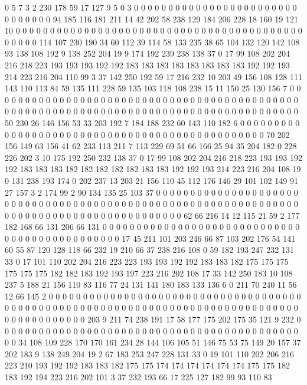 0 5 7 3 2 230 178 59 17 127 9 5 0 3 0 0 0 0 0 0
0 0 0 0 0 0 0 0 0 0 0 0 0 0 0 0 0 0 0 0
0 0 0 0 0 94 185 116 181 211 14 42 202 58 238 129 184 206 228 18
160 19 121 10 0 0 0 0 0 0 0 0 0 0 0 0 0 0 0 0
0 0 0 0 0 0 0 0 0 0 0 0 0 0 0 0 0 0 0 0
0 0 0 0 0 0 0 0 0 0 0 114 107 230 190 34 60 112 39 114
58 133 235 38 65 104 132 120 142 108 93 138 108 192 9 138 252 204 19 9
174 192 239 238 138 37 0 17 99 108 202 204 216 218 223 193 193 193 192 192
183 183 183 183 183 183 183 183 192 192 193 214 223 216 204 110 99 3 37 142
250 192 59 17 216 232 10 203 49 156 108 128 111 143 110 113 84 59 135 111
228 59 135 103 118 108 238 15 11 150 25 130 156 7 0 0 0 0 0 0
0 0 0 0 0 0 0 0 0 0 0 0 0 0 0 0 0 0 0 0
0 0 0 0 0 0 0 0 0 0 0 0 0 0 0 0 0 0 0 0
0 0 0 0 0 0 0 0 0 0 0 0 0 0 0 0 0 0 0 0
0 0 0 0 0 0 0 0 0 0 0 0 0 0 0 0 0 0 0 0
0 0 50 230 26 146 156 53 33 203 192 7 184 188 232 60 143 110 182 6
0 0 0 0 0 0 0 0 0 0 0 0 0 0 0 0 0 0 0 0
0 0 0 0 0 0 0 0 0 0 0 0 0 0 0 0 0 0 0 0
0 0 0 0 0 0 0 70 202 156 149 63 156 41 62 233 113 211 7 113
229 69 51 66 166 25 94 35 204 182 0 228 226 202 3 10 175 192 250 232
138 37 0 17 99 108 202 204 216 218 223 193 193 192 192 183 183 183 182 182
182 182 182 183 183 192 192 193 214 223 216 204 108 19 0 131 238 193 174 0
202 237 13 203 21 156 110 45 112 176 146 29 101 102 149 91 27 157 3 2
174 99 2 90 134 135 25 103 37 0 0 0 0 0 0 0 0 0 0 0
0 0 0 0 0 0 0 0 0 0 0 0 0 0 0 0 0 0 0 0
0 0 0 0 0 0 0 0 0 0 0 0 0 0 0 0 0 0 0 0
0 0 0 0 0 0 0 0 0 0 0 0 0 0 0 0 0 0 0 0
0 0 0 0 0 0 0 0 0 0 0 0 0 0 0 0 0 0 0 62
66 216 14 12 115 21 59 2 177 182 168 66 131 206 66 131 0 0 0 0
0 0 0 0 0 0 0 0 0 0 0 0 0 0 0 0 0 0 0 0
0 0 0 0 0 0 0 0 0 0 0 0 0 0 0 0 0 0 0 0
0 0 17 45 211 101 203 246 66 87 103 202 176 54 141 60 55 87 120 128
118 66 232 19 210 66 37 238 216 108 0 59 182 193 247 232 131 33 0 17
101 110 202 204 216 223 223 193 193 192 192 183 183 182 175 175 175 175 175 175
182 182 183 192 193 197 223 216 202 108 17 33 142 250 183 10 108 237 5 188
21 156 110 83 116 77 24 131 141 180 183 133 136 6 0 211 70 240 11 56
12 66 145 2 0 0 0 0 0 0 0 0 0 0 0 0 0 0 0 0
0 0 0 0 0 0 0 0 0 0 0 0 0 0 0 0 0 0 0 0
0 0 0 0 0 0 0 0 0 0 0 0 0 0 0 0 0 0 0 0
0 0 0 0 0 0 0 0 0 0 0 0 0 0 0 0 0 0 0 0
0 0 0 0 0 0 0 0 0 0 0 0 0 0 0 0 203 9 211 74
238 191 17 58 177 175 202 175 35 121 9 232 0 0 0 0 0 0 0 0
0 0 0 0 0 0 0 0 0 0 0 0 0 0 0 0 0 0 0 0
0 0 0 0 0 0 0 0 0 0 0 0 0 0 0 0 0 0 34 108
109 228 170 170 161 234 28 144 106 105 51 146 75 53 75 149 20 157 37 202
183 9 138 249 204 19 2 67 183 253 247 228 131 33 0 19 101 110 202 206
216 223 210 193 192 192 183 183 182 175 175 174 174 174 174 174 174 175 175 182
183 192 194 223 216 202 101 3 37 232 193 66 17 225 127 182 99 93 110 83
